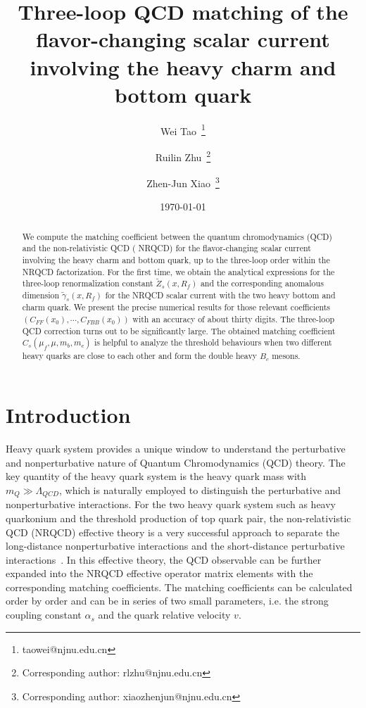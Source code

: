 \documentclass[onecolumn,preprintnumbers,aps,superscriptaddress,nofootinbib,prd,notitlepage]{revtex4-1}
\begin{document}
	
\title{Three-loop QCD matching of  the flavor-changing scalar current involving the heavy charm and bottom quark}
\author{Wei Tao~\footnote{taowei@njnu.edu.cn}}
\author{ Ruilin Zhu~\footnote{Corresponding author: rlzhu@njnu.edu.cn} }
\author{Zhen-Jun Xiao~\footnote{Corresponding author: xiaozhenjun@njnu.edu.cn} }

\date{\today}
\vspace{0.5in}
	
\begin{abstract}
We compute the matching coefficient between the quantum chromodynamics (QCD) and the non-relativistic QCD ( NRQCD)  for the flavor-changing scalar current involving the heavy charm and bottom quark,
up to the three-loop order within the NRQCD factorization.
For the first time, we obtain the analytical expressions for the three-loop  renormalization constant $\tilde{Z}_s(x,R_f)$ and the corresponding anomalous dimension $\tilde{\gamma}_s(x,R_f)$
for	the NRQCD scalar current with the two heavy  bottom and charm quark.  We  present the precise numerical results for those relevant coefficients $(C_{FF}(x_0), \cdots, C_{FBB}(x_0))$
 with an accuracy of about thirty digits.
The three-loop QCD correction turns out to be significantly 	large. The obtained  matching coefficient  $C_s(\mu_f,\mu,m_b,m_c)$ is helpful to analyze the threshold behaviours
when two different heavy quarks are close to each other and form the double heavy $B_c$ mesons.
\end{abstract}
	
\maketitle


\section{Introduction}

Heavy quark system provides a unique window to understand the perturbative and nonperturbative nature of  Quantum Chromodynamics (QCD) theory.
The key quantity of the heavy quark system is the heavy quark mass with $m_Q\gg \Lambda_{QCD}$, which is naturally employed to distinguish the perturbative and nonperturbative
interactions.  For the two heavy quark system such as heavy quarkonium and the threshold production of top quark pair,
the non-relativistic QCD (NRQCD) effective theory is a very successful approach to separate the long-distance nonperturbative interactions and the short-distance perturbative interactions~\cite{Bodwin:1994jh}.
In this effective theory, the QCD observable can be further expanded into the NRQCD effective operator matrix elements with the corresponding matching coefficients.
The matching coefficients can be calculated order by order and can be in series of two small parameters, i.e. the strong coupling constant $\alpha_{s}$ and the quark relative velocity $v$.
\end{document}
